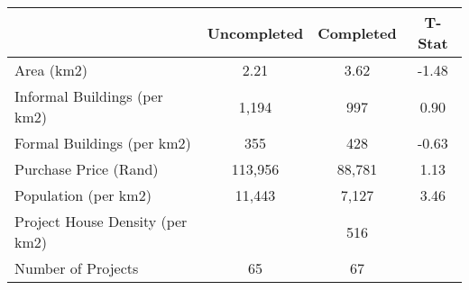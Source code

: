 \begin{tabular}{l*{1}{ccc}}
 &Uncompleted &Completed &T-Stat  \\
\hline 
Area (km2) &       2.21 &       3.62 &      -1.48  \\
Informal Buildings (per km2) &      1,194 &        997 &       0.90  \\
Formal Buildings (per km2) &        355 &        428 &      -0.63  \\
Purchase Price (Rand) &    113,956 &     88,781 &       1.13  \\
Population (per km2) &     11,443 &      7,127 &       3.46  \\
Project House Density (per km2) &  &        516 &   \\
Number of Projects &         65 &         67 &   \\
\hline
\end{tabular}